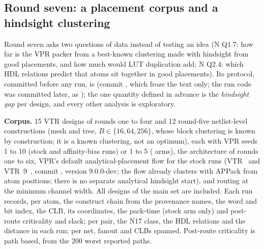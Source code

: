 \subsection{Round seven: a placement corpus and a hindsight clustering}
\label{sec:r7-method}
Round seven asks two questions of data instead of testing an idea (N Q1.7: how far is the VPR packer from a best-known clustering made with
hindsight from good placements, and how much would LUT duplication add; N Q2.4: which HDL relations predict that atoms sit together in good
placements). Its protocol, committed before any run, is  (commit , which froze the text only; the run code was
committed later, as ); the one quantity defined in
advance is the \emph{hindsight gap} per design, and every other analysis is exploratory.

\textbf{Corpus.} 15 VTR designs of rounds one to four and 12 round-five netlist-level constructions
(mesh and tree, $B\in\{16,64,256\}$, whose block clustering is known by construction; it is a known clustering, not an optimum), each with VPR seeds 1 to 10 (stock and affinity-bias runs) or 1 to 5 ( arms), the architecture of rounds one
to six, VPR's default analytical-placement flow for the stock runs (VTR~\cite{rose2012vtr} and VTR~9~\cite{elgammal2025vtr9}, commit , version 9.0.0-dev; the flow already clusters with APPack from atom positions; there is no separate analytical hindsight
start), and routing at the minimum channel width. All designs of the main set are included. Each run records, per atom, the construct chain from the provenance names, the word and bit
index, the CLB, its coordinates, the pack-time (stock arm only) and post-route criticality and slack; per pair, the N17 class, the HDL relations and the distance in
each run; per net, fanout and CLBs spanned. Post-route criticality is path based, from the 200 worst reported paths.


